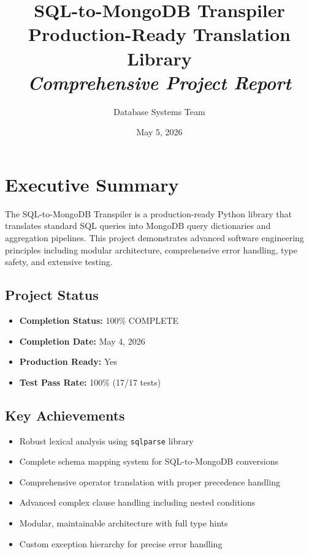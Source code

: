 \documentclass[12pt,a4paper]{article}
\title{\huge \textbf{SQL-to-MongoDB Transpiler}\\
    \Large Production-Ready Translation Library\\
    \vspace{0.5cm}
    \normalsize \textit{Comprehensive Project Report}}
\author{Database Systems Team}
\date{May 5, 2026}
\begin{document}
\maketitle

\tableofcontents
\newpage

\section{Executive Summary}

The SQL-to-MongoDB Transpiler is a production-ready Python library that translates standard SQL queries into MongoDB query dictionaries and aggregation pipelines. This project demonstrates advanced software engineering principles including modular architecture, comprehensive error handling, type safety, and extensive testing.

\subsection{Project Status}
\begin{itemize}
    \item \textbf{Completion Status:} 100\% COMPLETE
    \item \textbf{Completion Date:} May 4, 2026
    \item \textbf{Production Ready:} Yes
    \item \textbf{Test Pass Rate:} 100\% (17/17 tests)
\end{itemize}

\subsection{Key Achievements}
\begin{itemize}
    \item Robust lexical analysis using \texttt{sqlparse} library
    \item Complete schema mapping system for SQL-to-MongoDB conversions
    \item Comprehensive operator translation with proper precedence handling
    \item Advanced complex clause handling including nested conditions
    \item Modular, maintainable architecture with full type hints
    \item Custom exception hierarchy for precise error handling
\end{itemize}
\end{document}
